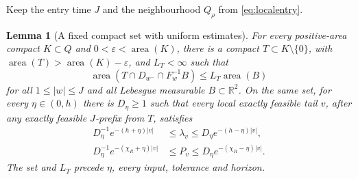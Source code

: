 \documentclass[11pt]{amsart}
\newtheorem{lemma}[theorem]{Lemma}
\theoremstyle{definition}
\theoremstyle{remark}
\newcommand{\R}{\mathbb R}
\newcommand{\area}{\operatorname{area}}
\numberwithin{equation}{section}
\begin{document}
Keep the entry time $J$ and the neighbourhood $Q_\rho$ from
\eqref{eq:localentry}.

\begin{lemma}[A fixed compact set with uniform estimates]\label{lem:regularwindow}
For every positive-area compact \(K\subset Q\) and
\(0<\varepsilon<\area(K)\), there is a compact
\(T\subset K\setminus\{0\}\), with
\(\area(T)>\area(K)-\varepsilon\), and \(L_T<\infty\) such that
\begin{equation}\label{eq:finitecharts}
\area(T\cap D_{w^-}\cap F_w^{-1}B)\le L_T\area(B)
\end{equation}
for all \(1\le|w|\le J\) and all Lebesgue measurable
\(B\subset\R^2\).
On the same set, for every \(\eta\in(0,h)\) there is \(D_{\eta}\ge1\) such
that every local exactly feasible tail \(v\), after any exactly
feasible \(J\)-prefix from \(T\), satisfies
\begin{equation}\label{eq:typicalproducts}
\begin{split}
D_{\eta}^{-1}e^{-(h+\eta)|v|}&\le\lambda_v\le D_{\eta} e^{-(h-\eta)|v|},\\
D_{\eta}^{-1}e^{-(\chi_R+\eta)|v|}&\le P_v\le D_{\eta} e^{-(\chi_R-\eta)|v|}.
\end{split}
\end{equation}
The set and \(L_T\) precede \(\eta\), every input, tolerance and horizon.
\end{lemma}
\end{document}
